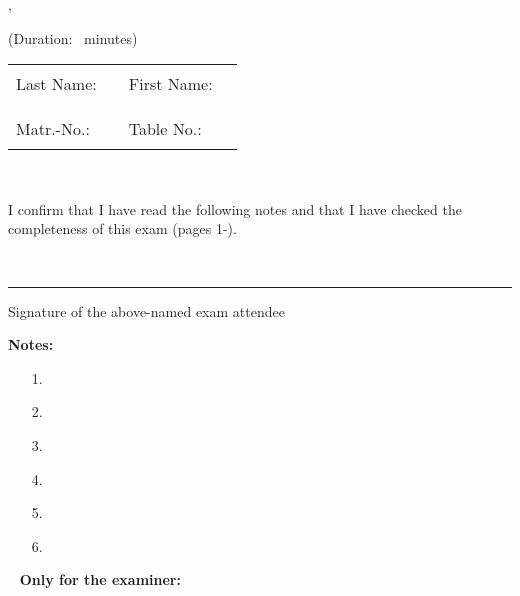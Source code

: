 \thispagestyle{empty}

\hfill
\begin{minipage}[b]{0.7\textwidth}
\end{minipage}
\begin{flushright}
	\chairName
\end{flushright}
\begin{flushright}
	\vspace{0.5cm}\examDate
\end{flushright}

\enlargethispage{3em}

{\Large
	\begin{center}
		\examType, \examSemester
	
		\textbf{\examName} 
	
		(Duration: \examMinutes \ minutes)
	\end{center}
}

{\large
	\vspace{1cm}
	\begin{tabular}{llll}
		Last Name: & \rule{4cm}{1pt} & First Name: & \rule{4.5cm}{1pt}  \\
		&&& \\
		Matr.-No.: & \rule{4cm}{1pt} & Table No.: & \rule{4.5cm}{1pt} \\
	\end{tabular}
}

~\vspace{0.0cm}

I confirm that I have read the following notes and that I have checked the com\-plete\-ness
of this exam (pages 1-\pageref{LastPage}).

~\vspace{0.5cm}

\begin{flushright}
	\begin{minipage}{8cm}
		\rule{\textwidth}{0.5pt}
		Signature of the above-named exam attendee
	\end{minipage}
\end{flushright}

\textbf{Notes:}

\begin{itemize}
	\item[1.] \noteA
	\item[2.] \noteB
	\item[3.] \noteC
	\item[4.] \noteD
	\item[5.] \noteE
	\item[6.] \noteF
\end{itemize}
~
\smallbreak
{\footnotesize
	\textbf{Only for the examiner:}
}

